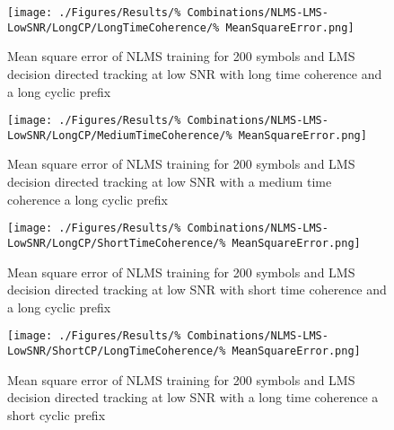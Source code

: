 \begin{figure}[ht]
	\centering
	\begin{minipage}{0.49\textwidth}
		\centering
		\texttt{[image: ./Figures/Results/\%
	Combinations/NLMS-LMS-LowSNR/LongCP/LongTimeCoherence/\%
	MeanSquareError.png]}
		\captionsetup{width=0.75\linewidth}
		\caption{Mean square error of NLMS training for 200 symbols 
	and LMS decision directed tracking at low SNR with long time coherence 
	and a long cyclic prefix}
		\label{fig:Combination-Long-Long}
	\end{minipage}
	\begin{minipage}{0.49\textwidth}
		\centering
		\texttt{[image: ./Figures/Results/\%
	Combinations/NLMS-LMS-LowSNR/LongCP/MediumTimeCoherence/\%
	MeanSquareError.png]}
		\captionsetup{width=0.75\linewidth}
		\caption{Mean square error of NLMS training for 200 symbols 
	and LMS decision directed tracking at low SNR with a medium time coherence 
	a long cyclic prefix}
	\end{minipage}
\end{figure}

\begin{figure}[ht]
	\centering
	\begin{minipage}{0.49\textwidth}
		\centering
		\texttt{[image: ./Figures/Results/\%
	Combinations/NLMS-LMS-LowSNR/LongCP/ShortTimeCoherence/\%
	MeanSquareError.png]}
		\captionsetup{width=0.75\linewidth}
		\caption{Mean square error of NLMS training for 200 symbols 
	and LMS decision directed tracking at low SNR with short time coherence 
	and a long cyclic prefix}
	\end{minipage}
	\begin{minipage}{0.49\textwidth}
		\centering
		\texttt{[image: ./Figures/Results/\%
	Combinations/NLMS-LMS-LowSNR/ShortCP/LongTimeCoherence/\%
	MeanSquareError.png]}
		\captionsetup{width=0.75\linewidth}
		\caption{Mean square error of NLMS training for 200 symbols 
	and LMS decision directed tracking at low SNR with a long time coherence 
	a short cyclic prefix}
	\end{minipage}
\end{figure}

